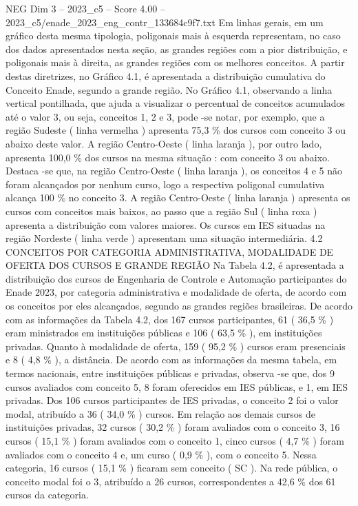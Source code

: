 \begin{textsample}{NEG Dim 3 – 2023\_c5 – Score 4.00 – 2023\_c5/enade\_2023\_eng\_contr\_133684c9f7.txt}
Em linhas gerais, em um gráfico desta mesma tipologia, poligonais mais à esquerda representam, no caso dos dados apresentados nesta seção, as grandes regiões com a pior distribuição, e poligonais mais à direita, as grandes regiões com os melhores conceitos.
A partir destas diretrizes, no Gráfico 4.1, é apresentada a distribuição cumulativa do Conceito Enade, segundo a grande região.
No Gráfico 4.1, observando a linha vertical pontilhada, que ajuda a visualizar o percentual de conceitos acumulados até o valor 3, ou seja, conceitos 1, 2 e 3, pode -se notar, por exemplo, que a região Sudeste ( linha vermelha ) apresenta 75,3 \% dos cursos com conceito 3 ou abaixo deste valor.
A região Centro-Oeste ( linha laranja ), por outro lado, apresenta 100,0 \% dos cursos na mesma situação : com conceito 3 ou abaixo.
Destaca -se que, na região Centro-Oeste ( linha laranja ), os conceitos 4 e 5 não foram alcançados por nenhum curso, logo a respectiva poligonal cumulativa alcança 100 \% no conceito 3.
A região Centro-Oeste ( linha laranja ) apresenta os cursos com conceitos mais baixos, ao passo que a região Sul ( linha roxa ) apresenta a distribuição com valores maiores.
Os cursos em IES situadas na região Nordeste ( linha verde ) apresentam uma situação intermediária. 4.2 CONCEITOS POR CATEGORIA ADMINISTRATIVA, MODALIDADE DE OFERTA DOS CURSOS E GRANDE REGIÃO Na Tabela 4.2, é apresentada a distribuição dos cursos de Engenharia de Controle e Automação participantes do Enade 2023, por categoria administrativa e modalidade de oferta, de acordo com os conceitos por eles alcançados, segundo as grandes regiões brasileiras.
De acordo com as informações da Tabela 4.2, dos 167 cursos participantes, 61 ( 36,5 \% ) eram ministrados em instituições públicas e 106 ( 63,5 \% ), em instituições privadas.
Quanto à modalidade de oferta, 159 ( 95,2 \% ) cursos eram presenciais e 8 ( 4,8 \% ), a distância.
De acordo com as informações da mesma tabela, em termos nacionais, entre instituições públicas e privadas, observa -se que, dos 9 cursos avaliados com conceito 5, 8 foram oferecidos em IES públicas, e 1, em IES privadas.
Dos 106 cursos participantes de IES privadas, o conceito 2 foi o valor modal, atribuído a 36 ( 34,0 \% ) cursos.
Em relação aos demais cursos de instituições privadas, 32 cursos ( 30,2 \% ) foram avaliados com o conceito 3, 16 cursos ( 15,1 \% ) foram avaliados com o conceito 1, cinco cursos ( 4,7 \% ) foram avaliados com o conceito 4 e, um curso ( 0,9 \% ), com o conceito 5.
Nessa categoria, 16 cursos ( 15,1 \% ) ficaram sem conceito ( SC ).
Na rede pública, o conceito modal foi o 3, atribuído a 26 cursos, correspondentes a 42,6 \% dos 61 cursos da categoria.

\end{textsample}
